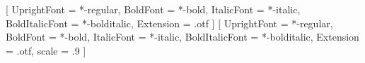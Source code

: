 \RequirePackage[zihao = -4]{ctex}
\linespread{1.4}
\setlength{\parindent}{2\ccwd}
\setmainfont{texgyretermes}
  [
    UprightFont = *-regular,
    BoldFont = *-bold,
    ItalicFont = *-italic,
    BoldItalicFont = *-bolditalic,
    Extension = .otf
  ]
\setsansfont{texgyreheros}
  [
    UprightFont = *-regular,
    BoldFont = *-bold,
    ItalicFont = *-italic,
    BoldItalicFont = *-bolditalic,
    Extension = .otf,
    scale = .9
  ]
\endinput